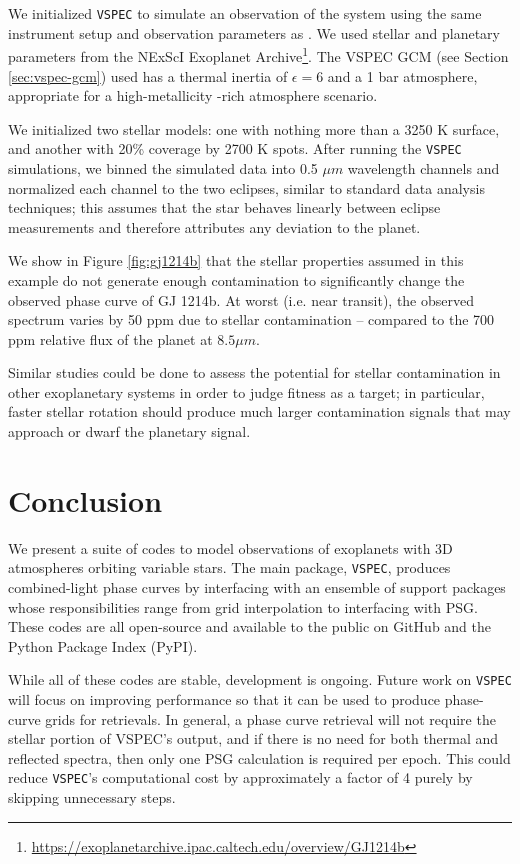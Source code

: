\documentclass[linenumbers,5p,twocolumn,authoryear]{elsarticle}
\newcommand{\vspec}[1]{\texttt{VSPEC}#1}
\begin{document}
We initialized \vspec{} to simulate an observation of the system using the same instrument setup and observation parameters as \citet{kempton2023}. We used stellar and planetary parameters from the NExScI Exoplanet Archive\footnote{\url{https://exoplanetarchive.ipac.caltech.edu/overview/GJ1214b}}. The VSPEC GCM (see Section \ref{sec:vspec-gcm}) used has a thermal inertia of $\epsilon = 6$ and a 1 bar  atmosphere, appropriate for a high-metallicity -rich atmosphere scenario.

We initialized two stellar models: one with nothing more than a 3250 K surface, and another with 20\% coverage by 2700 K spots. After running the \vspec{} simulations, we binned the simulated data into 0.5 $\mu m$ wavelength channels and normalized each channel to the two eclipses, similar to standard data analysis techniques; this assumes that the star behaves linearly between eclipse measurements and therefore attributes any deviation to the planet.

We show in Figure \ref{fig:gj1214b} that the stellar properties assumed in this example do not generate enough contamination to
significantly change the observed phase curve of GJ 1214b. At worst (i.e. near transit), the observed spectrum varies by 50 ppm due to stellar
contamination -- compared to the 700 ppm relative flux of the planet at $8.5 {\mu m}$. 

Similar studies could be done to assess the potential for
stellar contamination in other exoplanetary systems in order to judge fitness as a target; in particular, faster stellar rotation should produce much larger contamination signals that may approach or dwarf the planetary signal.

\section{Conclusion}
\label{sec:conclusion}
We present a suite of codes to model observations of exoplanets with 3D atmospheres orbiting variable stars. The main package, \vspec{}, produces combined-light phase curves by interfacing with an ensemble of support packages whose responsibilities range from grid interpolation to interfacing with PSG. These codes are all open-source and available to the public on GitHub and the Python Package Index (PyPI).

While all of these codes are stable, development is ongoing. Future work on \vspec{} will focus on improving performance so that it can be used to produce phase-curve grids for retrievals. In general, a phase curve retrieval will not require the stellar portion of VSPEC's output, and if there is no need for both thermal and reflected spectra, then only one PSG calculation is required per epoch. This could reduce \vspec{}'s computational cost by approximately a factor of 4 purely by skipping unnecessary steps.
\end{document}
